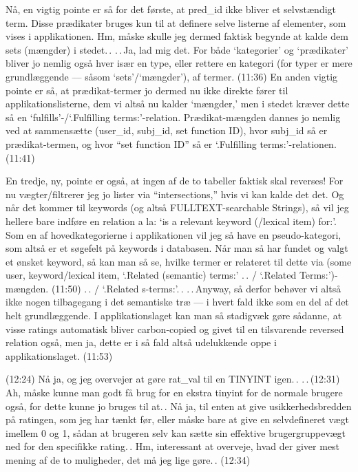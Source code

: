 \documentclass{report}
\begin{document}
Nå, en vigtig pointe er så for det første, at pred\_id ikke bliver et selvstændigt term. Disse prædikater bruges kun til at definere selve listerne af elementer, som vises i applikationen. Hm, måske skulle jeg dermed faktisk begynde at kalde dem sets (mængder) i stedet.\,. .\,.\,Ja, lad mig det. For både `kategorier' og `prædikater' bliver jo nemlig også hver især en type, eller rettere en kategori (for typer er mere grundlæggende --- såsom `sets'/`mængder'), af termer. (11:36) En anden vigtig pointe er så, at prædikat-termer jo dermed nu ikke direkte fører til applikationslisterne, dem vi altså nu kalder `mængder,' men i stedet kræver dette så en `fulfills'-/`.Fulfilling terms:'-relation. Prædikat-mængden dannes jo nemlig ved at sammensætte (user\_id, subj\_id, set function ID), hvor subj\_id så er prædikat-termen, og hvor ``set function ID'' så er `.Fulfilling terms:'-relationen. (11:41)

En tredje, ny, pointe er også, at ingen af de to tabeller faktisk skal reverses! For nu vægter/filtrerer jeg jo lister via ``intersections,'' hvis vi kan kalde det det. Og når det kommer til keywords (og altså FULLTEXT-searchable Strings), så vil jeg hellere bare indføre en relation a la: `is a relevant keyword (/lexical item) for:'. Som en af hovedkategorierne i applikationen vil jeg så have en pseudo-kategori, som altså er et søgefelt på keywords i databasen. Når man så har fundet og valgt et ønsket keyword, så kan man så se, hvilke termer er relateret til dette via (some user, keyword/lexical item, `.Related (semantic) terms:' .\,. / `.Related Terms:')-mængden. (11:50) .\,. / `.Related s-terms:'.\,. .\,.\,Anyway, så derfor behøver vi altså ikke nogen tilbagegang i det semantiske træ --- i hvert fald ikke som en del af det helt grundlæggende. I applikationslaget kan man så stadigvæk gøre sådanne, at visse ratings automatisk bliver carbon-copied og givet til en tilsvarende reversed relation også, men ja, dette er i så fald altså udelukkende oppe i applikationslaget. (11:53)

(12:24) Nå ja, og jeg overvejer at gøre rat\_val til en TINYINT igen.\,. .\,.\,(12:31) Ah, måske kunne man godt få brug for en ekstra tinyint for de normale brugere også, for dette kunne jo bruges til at.\,. Nå ja, til enten at give usikkerhedsbredden på ratingen, som jeg har tænkt før, eller måske bare at give en selvdefineret vægt imellem 0 og 1, sådan at brugeren selv kan sætte sin effektive brugergruppevægt ned for den specifikke rating.\,. Hm, interessant at overveje, hvad der giver mest mening af de to muligheder, det må jeg lige gøre.\,. (12:34)
\end{document}
